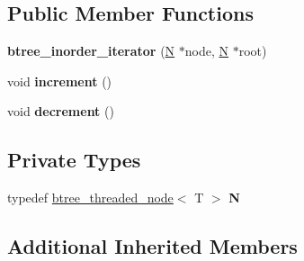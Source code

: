 \subsection*{Public Member Functions}
\begin{DoxyCompactItemize}
\item 
\hypertarget{classtree_1_1btree__inorder__iterator_3_01T_00_01btree__threaded__node_3_01T_01_4_01_4_afd6683f0b4f5a8336d41497ed5d442d9}{{\bfseries btree\-\_\-inorder\-\_\-iterator} (\hyperlink{structtree_1_1btree__threaded__node}{N} $\ast$node, \hyperlink{structtree_1_1btree__threaded__node}{N} $\ast$root)}\label{classtree_1_1btree__inorder__iterator_3_01T_00_01btree__threaded__node_3_01T_01_4_01_4_afd6683f0b4f5a8336d41497ed5d442d9}

\item 
\hypertarget{classtree_1_1btree__inorder__iterator_3_01T_00_01btree__threaded__node_3_01T_01_4_01_4_ad7bab9e59be6a764fd33a2aa7b938217}{void {\bfseries increment} ()}\label{classtree_1_1btree__inorder__iterator_3_01T_00_01btree__threaded__node_3_01T_01_4_01_4_ad7bab9e59be6a764fd33a2aa7b938217}

\item 
\hypertarget{classtree_1_1btree__inorder__iterator_3_01T_00_01btree__threaded__node_3_01T_01_4_01_4_aa1c7f49bf110199f92d201bebbd475f9}{void {\bfseries decrement} ()}\label{classtree_1_1btree__inorder__iterator_3_01T_00_01btree__threaded__node_3_01T_01_4_01_4_aa1c7f49bf110199f92d201bebbd475f9}

\end{DoxyCompactItemize}
\subsection*{Private Types}
\begin{DoxyCompactItemize}
\item 
\hypertarget{classtree_1_1btree__inorder__iterator_3_01T_00_01btree__threaded__node_3_01T_01_4_01_4_a5c79484a07c883063ddbf6a545880231}{typedef \hyperlink{structtree_1_1btree__threaded__node}{btree\-\_\-threaded\-\_\-node}$<$ T $>$ {\bfseries N}}\label{classtree_1_1btree__inorder__iterator_3_01T_00_01btree__threaded__node_3_01T_01_4_01_4_a5c79484a07c883063ddbf6a545880231}

\end{DoxyCompactItemize}
\subsection*{Additional Inherited Members}



